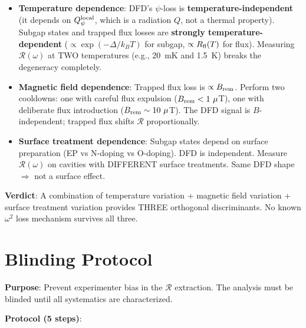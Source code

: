 \documentclass[11pt]{article}
\newcommand{\Qpsi}{Q_\psi}
\theoremstyle{definition}
\theoremstyle{remark}
\begin{document}
\begin{itemize}[nosep]
\item \textbf{Temperature dependence}: DFD's $\psi$-loss is
  \textbf{temperature-independent} (it depends on $\Qpsi^{\rm local}$,
  which is a radiation $Q$, not a thermal property). Subgap states
  and trapped flux losses are \textbf{strongly temperature-dependent}
  ($\propto \exp(-\Delta/k_B T)$ for subgap, $\propto R_{\rm fl}(T)$
  for flux). Measuring $\mathcal{R}(\omega)$ at TWO temperatures
  (e.g., 20~mK and 1.5~K) breaks the degeneracy completely.

\item \textbf{Magnetic field dependence}: Trapped flux loss is
  $\propto B_{\rm rem}$. Perform two cooldowns: one with careful
  flux expulsion ($B_{\rm rem} < 1~\mu$T), one with deliberate
  flux introduction ($B_{\rm rem} \sim 10~\mu$T). The DFD signal
  is $B$-independent; trapped flux shifts $\mathcal{R}$
  proportionally.

\item \textbf{Surface treatment dependence}: Subgap states depend
  on surface preparation (EP vs N-doping vs O-doping). DFD is
  independent. Measure $\mathcal{R}(\omega)$ on cavities with
  DIFFERENT surface treatments. Same DFD shape $\Rightarrow$ not
  a surface effect.
\end{itemize}

\textbf{Verdict}: A combination of temperature variation + magnetic
field variation + surface treatment variation provides THREE orthogonal
discriminants. No known $\omega^2$ loss mechanism survives all three.


\section{Blinding Protocol}

\textbf{Purpose}: Prevent experimenter bias in the $\mathcal{R}$
extraction. The analysis must be blinded until all systematics
are characterized.

\textbf{Protocol (5 steps)}:
\end{document}
